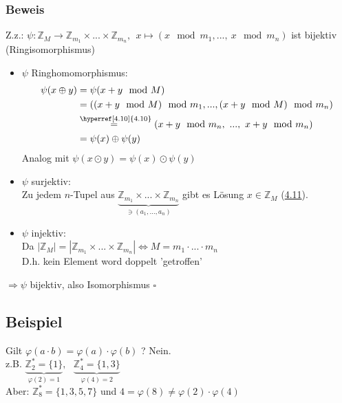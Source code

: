\documentclass[a4paper, 12pt,titlepage, pdf, headsepline]{article}
\newcommand{\qed}{\hfill$\square$}
\renewcommand{\>}{\rightarrow}
\renewcommand{\*}{\cdot}
\renewcommand{\phi}{\varphi}
\begin{document}
		      	\subsubsection*{Beweis}
		      	Z.z.: $\psi : \mathds{Z}_M \rightarrow \mathds{Z}_{m_1} \times ... \times \mathds{Z}_{m_n},~~ x \mapsto (x \mod m_1,...,~x \mod m_n)$ ist bijektiv (Ringisomorphismus)
		      	\begin{itemize}
		      		\item $\psi$ Ringhomomorphismus:
		      		      \begin{align*}
		      		      	\psi (x \oplus y) & = \psi(x+y \mod M)                                                              \\
		      		      	                  & = ((x+y \mod M) \mod m_1,..., (x+y \mod M) \mod m_n)                            \\
		      		      	                  & \overset{\textrm{\hyperref[4.10]{4.10}}}{=~} (x+y \mod m_n,~..., ~x+y \mod m_n) \\
		      		      	                  & = \psi(x) \oplus \psi(y)                                                        
		      		      \end{align*}
		      		      Analog mit $\psi(x \odot y) = \psi(x) \odot \psi(y)$
		      		\item $\psi$ surjektiv:\\
		      		      Zu jedem $n$-Tupel aus $\underbrace{\mathds{Z}_{m_1} \times ... \times \mathds{Z}_{m_n}}_{\ni(a_1,...,a_n)}$ gibt es Lösung $x \in \mathds{Z}_M$ (\hyperref[4.11]{4.11}).
		      		\item $\psi$ injektiv: \\
		      		      Da $| \mathds{Z}_M| = | \mathds{Z}_{m_1} \times ... \times \mathds{Z}_{m_n}| \Leftrightarrow M = m_1 \cdot ... \cdot m_n$ \\
		      		      D.h. kein Element word doppelt 'getroffen' \\
		      	\end{itemize}
		      	$\Rightarrow \psi$ bijektiv, also Isomorphismus 
		      	\qed
		      	\subsection{Beispiel}
		      	Gilt $\phi (a \cdot b) = \phi(a) \cdot \phi(b)$ ? Nein.\\
		      	z.B. $\underbrace{\mathds{Z}_2^* = \{1\}}_{\phi(2) = 1},~~~ \underbrace{\mathds{Z}_4^* = \{1,3\}}_{\phi(4)= 2}$\\
		      	Aber: $\mathds{Z}_8^* =\{1,3,5,7\}$ und $4 = \phi(8) \neq \phi(2) \cdot \phi(4)$
\end{document}
